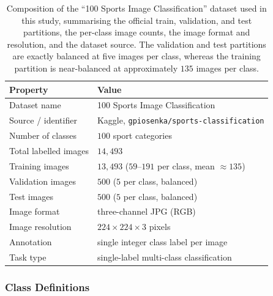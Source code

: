 \begin{table}[htbp]
\centering
\caption{Composition of the ``100 Sports Image Classification'' dataset \citep{piosenka2022sports} used in this study, summarising the official train, validation, and test partitions, the per-class image counts, the image format and resolution, and the dataset source. The validation and test partitions are exactly balanced at five images per class, whereas the training partition is near-balanced at approximately $135$ images per class.}
\label{tab:dataset}
\begin{tabular}{ll}
\toprule
\textbf{Property} & \textbf{Value} \\
\midrule
Dataset name          & 100 Sports Image Classification \\
Source / identifier   & Kaggle, \texttt{gpiosenka/sports-classification} \\
Number of classes     & $100$ sport categories \\
Total labelled images & $14{,}493$ \\
Training images       & $13{,}493$ ($59$--$191$ per class, mean ${\approx}135$) \\
Validation images     & $500$ ($5$ per class, balanced) \\
Test images           & $500$ ($5$ per class, balanced) \\
Image format          & three-channel JPG (RGB) \\
Image resolution      & $224\times224\times3$ pixels \\
Annotation            & single integer class label per image \\
Task type             & single-label multi-class classification \\
\bottomrule
\end{tabular}
\end{table}

\subsubsection{Class Definitions}
\label{subsubsec:method-classes}

